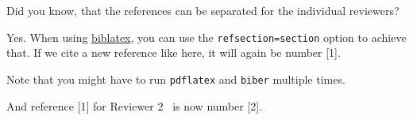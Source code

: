 \reviewer
\begin{revcomment}
	Did you know, that the references can be separated for the individual reviewers?
\end{revcomment}
\begin{revresponse}
	Yes. When using \href{https://www.ctan.org/pkg/biblatex}{biblatex}, you can use the \texttt{refsection=section} option to achieve that.
	If we cite a new reference like \cite{Besser2021} here, it will again be number [1].
	
	Note that you might have to run \texttt{pdflatex} and \texttt{biber} multiple times.
	
	And reference [1] for Reviewer 2~\cite{ReviewerReference} is now number [2].
	
\end{revresponse}